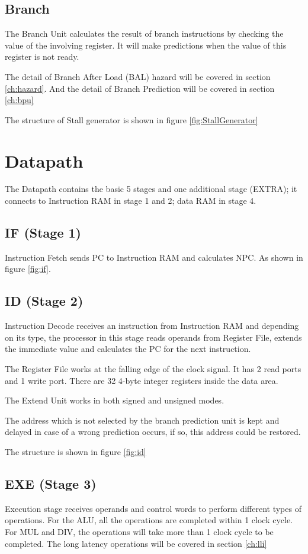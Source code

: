 \subsection[Branch]{Branch}
The Branch Unit calculates the result of branch instructions by checking the value
of the involving register. It will make predictions when the value of this register
is not ready.

The detail of Branch After Load (BAL) hazard will be covered in section \ref{ch:hazard}. And the
detail of Branch Prediction will be covered in section \ref{ch:bpu}

The structure of Stall generator is shown in figure \ref{fig:StallGenerator}

\section[Datapath]{Datapath}
The Datapath contains the basic 5 stages and one additional stage (EXTRA); it connects to Instruction RAM
in stage 1 and 2; data RAM in stage 4.

\subsection[IF (Stage 1)]{IF (Stage 1)}
Instruction Fetch sends PC to Instruction RAM and calculates NPC. As shown in figure \ref{fig:if}.

\subsection[ID (Stage 2)]{ID (Stage 2)}
Instruction Decode receives an instruction from Instruction RAM and depending on its type, the processor in this stage
reads operands from Register File, extends the immediate value and calculates the PC for the next instruction.

The Register File works at the falling edge of the clock signal. It has 2 read ports and 1 write port. There are 32 4-byte integer registers
inside the data area.

The Extend Unit works in both signed and unsigned modes.

The address which is not selected by the branch prediction unit is kept and delayed in case of a wrong prediction occurs,
if so, this address could be restored.

The structure is shown in figure \ref{fig:id}

\subsection[EXE (Stage 3)]{EXE (Stage 3)}
Execution stage receives operands and control words to perform different types of operations. For the ALU, all the operations
are completed within 1 clock cycle. For MUL and DIV, the operations will take more than 1 clock cycle to be completed. The long
latency operations will be covered in section \ref{ch:lli}


